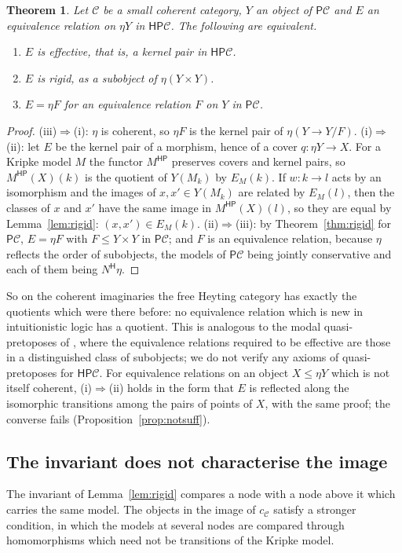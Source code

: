 \documentclass[11pt]{amsart}
\newtheorem{thm}{Theorem}[section]
\theoremstyle{definition}
\newcommand{\PP}{\mathsf P}
\newcommand{\HH}{\mathsf H}
\newcommand{\cC}{\mathcal C}
\begin{document}
\begin{thm}\label{thm:effective}
Let $\cC$ be a small coherent category, $Y$ an object of $\PP\cC$ and
$E$ an equivalence relation on $\eta Y$ in $\HH\PP\cC$. The following
are equivalent.
\begin{enumerate}
\item[(i)] $E$ is effective, that is, a kernel pair in $\HH\PP\cC$.
\item[(ii)] $E$ is rigid, as a subobject of $\eta(Y\times Y)$.
\item[(iii)] $E=\eta F$ for an equivalence relation $F$ on $Y$ in
$\PP\cC$.
\end{enumerate}
\end{thm}
\begin{proof}
(iii)$\Rightarrow$(i): $\eta$ is coherent, so $\eta F$ is the kernel
pair of $\eta(Y\to Y/F)$. (i)$\Rightarrow$(ii): let $E$ be the kernel
pair of a morphism, hence of a cover $q\colon\eta Y\to X$. For a
Kripke model $M$ the functor $M^{\HH\PP}$ preserves covers and kernel
pairs, so $M^{\HH\PP}(X)(k)$ is the quotient of $Y(M_k)$ by $E_M(k)$.
If $w\colon k\to l$ acts by an isomorphism and the images of $x,x'\in
Y(M_k)$ are related by $E_M(l)$, then the classes of $x$ and $x'$ have
the same image in $M^{\HH\PP}(X)(l)$, so they are equal by
Lemma~\ref{lem:rigid}: $(x,x')\in E_M(k)$. (ii)$\Rightarrow$(iii): by
Theorem~\ref{thm:rigid} for $\PP\cC$, $E=\eta F$ with $F\le Y\times Y$
in $\PP\cC$; and $F$ is an equivalence relation, because $\eta$
reflects the order of subobjects, the models of $\PP\cC$ being jointly
conservative and each of them being $N^{\HH}\eta$.
\end{proof}

So on the coherent imaginaries the free Heyting category has exactly
the quotients which were there before: no equivalence relation which
is new in intuitionistic logic has a quotient. This is analogous to
the modal quasi-pretoposes of \cite{GM25}, where the equivalence
relations required to be effective are those in a distinguished class
of subobjects; we do not verify any axioms of quasi-pretoposes for
$\HH\PP\cC$. For equivalence relations on an object $X\le\eta Y$ which
is not itself coherent, (i)$\Rightarrow$(ii) holds in the form that $E$
is reflected along the isomorphic transitions among the pairs of
points of $X$, with the same proof; the converse fails
(Proposition~\ref{prop:notsuff}).

\subsection*{The invariant does not characterise the image}
The invariant of Lemma~\ref{lem:rigid} compares a node with a node
above it which carries the same model. The objects in the image of
$c_\cC$ satisfy a stronger condition, in which the models at several
nodes are compared through homomorphisms which need not be transitions
of the Kripke model.
\end{document}

